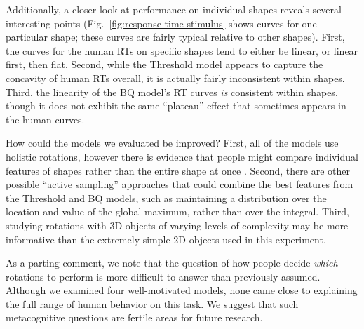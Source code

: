 \documentclass[10pt,letterpaper]{article}
\newcommand{\Th}[0]{Threshold}
\newcommand{\Bq}[0]{BQ}
\begin{document}
Additionally, a closer look at performance on individual shapes
reveals several interesting points
(Fig.~\ref{fig:response-time-stimulus} shows curves for one particular
shape; these curves are fairly typical relative to other
shapes). First, the curves for the human RTs on specific shapes tend
to either be linear, or linear first, then flat. Second, while the
\Th{} model appears to capture the concavity of human RTs overall, it
is actually fairly inconsistent within shapes. Third, the linearity of
the \Bq{} model's RT curves \textit{is} consistent within shapes,
though it does not exhibit the same ``plateau'' effect that sometimes
appears in the human curves.

How could the models we evaluated be improved? First, all of the
models use holistic rotations, however there is evidence that people
might compare individual features of shapes rather than the entire
shape at once \cite{Just1976,Yuille:1982tx}. Second, there are other
possible ``active sampling'' approaches that could combine the best
features from the \Th{} and \Bq{} models, such as maintaining a
distribution over the location and value of the global maximum, rather
than over the integral. Third, studying rotations with 3D objects of
varying levels of complexity may be more informative than the
extremely simple 2D objects used in this experiment.

As a parting comment, we note that the question of how people decide
\textit{which} rotations to perform is more difficult to answer than
previously assumed. Although we examined four well-motivated models,
none came close to explaining the full range of human behavior on this
task. We suggest that such metacognitive questions are fertile areas
for future research.




\renewcommand{\bibliographytypesize}{\small}
\setlength{\bibleftmargin}{.125in}
\setlength{\bibindent}{-\bibleftmargin}

\end{document}
